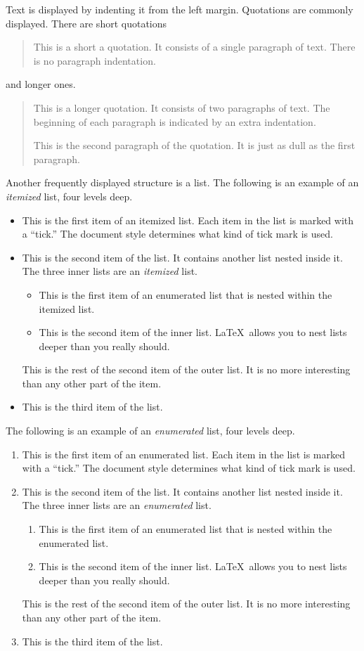 \documentclass[ba]{imsart}
\numberwithin{equation}{section}
\theoremstyle{plain}
\begin{document}
Text is displayed by indenting it from the left margin.  Quotations
are commonly displayed.  There are short quotations
\begin{quote}
  This is a short a quotation.  It consists of a single paragraph of
  text.  There is no paragraph indentation.
\end{quote}
and longer ones.
\begin{quotation}
  This is a longer quotation.  It consists of two paragraphs of text.
  The beginning of each paragraph is indicated by an extra
  indentation.

  This is the second paragraph of the quotation.  It is just as dull
  as the first paragraph.
\end{quotation}
Another frequently displayed structure is a list.  The following is an
example of an {\em itemized} list, four levels deep.
\begin{itemize}
\item This is the first item of an itemized list.  Each item in the
  list is marked with a ``tick.''  The document style determines what
  kind of tick mark is used.
\item This is the second item of the list.  It contains another list
  nested inside it.  The three inner lists are an {\em itemized} list.
    \begin{itemize}
    \item This is the first item of an enumerated list that is nested
      within the itemized list.
    \item This is the second item of the inner list.  \LaTeX\ allows
      you to nest lists deeper than you really should.
    \end{itemize}
    This is the rest of the second item of the outer list.  It is no
    more interesting than any other part of the item.
   \item  This is the third item of the list.
\end{itemize}


The following is an example of an {\em enumerated} list, four levels
deep.
\begin{enumerate}
\item This is the first item of an enumerated list.  Each item in the
  list is marked with a ``tick.''  The document style determines what
  kind of tick mark is used.
\item This is the second item of the list.  It contains another list
  nested inside it.  The three inner lists are an {\em enumerated}
  list.
  \begin{enumerate}
  \item This is the first item of an enumerated list that is nested
    within the enumerated list.
  \item This is the second item of the inner list.  \LaTeX\ allows you
    to nest lists deeper than you really should.
  \end{enumerate}
  This is the rest of the second item of the outer list.  It is no
  more interesting than any other part of the item.
\item This is the third item of the list.
\end{enumerate}
\end{document}
